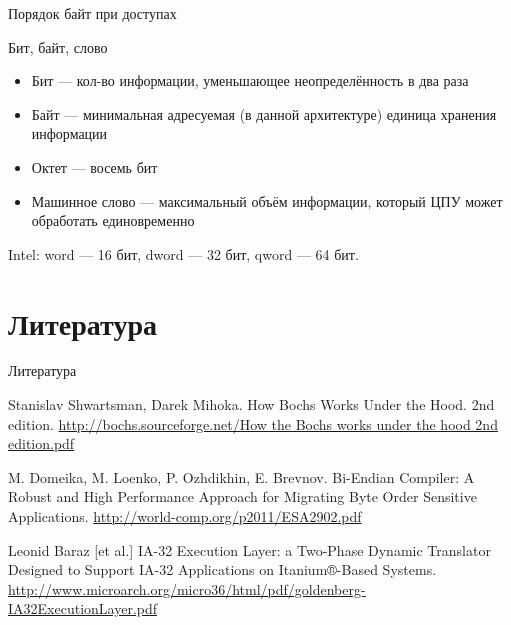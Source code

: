\documentclass{beamer}
\newcommand{\abbr}{\textit{англ.}\ }
\begin{document}
\begin{frame}{Порядок байт при доступах}



\end{frame}

\begin{frame}{Бит, байт, слово}
\begin{itemize}
\item Бит — кол-во информации, уменьшающее неопределённость в два раза\pause
\item Байт \pause — минимальная адресуемая (в данной архитектуре) единица хранения
информации \pause
\item Октет \pause — восемь бит \pause
\item Машинное слово \pause — максимальный объём информации, который ЦПУ может обработать единовременно
\end{itemize}

\pause
Intel: word — 16 бит, dword — 32 бит, qword — 64 бит.
\end{frame}



\section*{Литература}

\begin{frame}[allowframebreaks]{Литература}
\begin{thebibliography}{99}
     Stanislav Shwartsman, Darek Mihoka. How Bochs Works Under the Hood. 2nd edition.
    \url{http://bochs.sourceforge.net/How the Bochs works under the hood 2nd edition.pdf}
    
     M. Domeika, M. Loenko, P. Ozhdikhin, E. Brevnov.  Bi-Endian Compiler: A Robust and High Performance Approach for Migrating Byte Order Sensitive Applications.
    \url{http://world-comp.org/p2011/ESA2902.pdf}

     Leonid Baraz [et al.] IA-32 Execution Layer: a Two-Phase Dynamic Translator Designed to Support IA-32 Applications on Itanium®-Based Systems. \url{http://www.microarch.org/micro36/html/pdf/goldenberg-IA32ExecutionLayer.pdf}
\end{thebibliography}
\end{frame}
\end{document}
